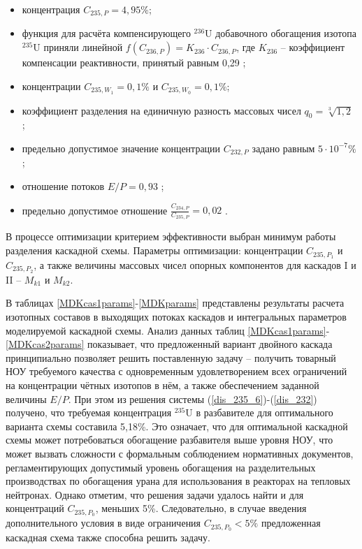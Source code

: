 {\begin{itemize}
    \item концентрация $C_{235,{P}} = {4,95\%}$; 
    \item функция для расчёта компенсирующего $^{236}$U добавочного обогащения изотопа $^{235}$U приняли линейной $f(C_{236,P}) = {K_{236}\cdot{C_{236,{P}}}}$, где $K_{236}$ -- коэффициент компенсации реактивности, принятый равным 0,29 \cite{smirnovEvolutionIsotopicComposition2012};
    \item концентрации $C_{235,{W_1}} = 0,1\%$ и $C_{235,{W_0}} = 0,1\%$;
    \item коэффициент разделения на единичную разность массовых чисел $q_{0} = \sqrt[3]{1,2}$ \cite{smirnovEvolutionIsotopicComposition2012};
    \item предельно допустимое значение концентрации $C_{232,{P}}$ задано равным $5\cdot10^{-7} \%$;
    \item отношение потоков $E/P = 0,93$ \cite{smirnovObogashchenieRegenerirovannogoUrana2018};
    \item предельно допустимое отношение $\frac{C_{234,{P}}}{C_{235,{P}}} = 0,02$ \cite{smirnovObogashchenieRegenerirovannogoUrana2018}. 
\end{itemize}

В процессе оптимизации критерием эффективности выбран минимум работы разделения каскадной схемы. Параметры оптимизации: концентрации $C_{235,{P_1}}$ и $C_{235,{P_2}}$, а также величины массовых чисел опорных компонентов для каскадов I и II -- $M_{k1}$ и $M_{k2}$. 

В таблицах \ref{MDKcas1params}-\ref{MDKparams} представлены результаты расчета изотопных составов в выходящих потоках каскадов и интегральных параметров моделируемой каскадной схемы. Анализ данных таблиц \ref{MDKcas1params}-\ref{MDKcas2params} показывает, что предложенный вариант двойного каскада принципиально позволяет решить поставленную задачу -- получить товарный НОУ требуемого качества с одновременным удовлетворением всех ограничений на концентрации чётных изотопов в нём, а также обеспечением заданной величины $E/P$. При этом из решения системы (\ref{dis_235_6})-(\ref{dis_232}) получено, что требуемая концентрация $^{235}$U в разбавителе для оптимального варианта схемы составила 5,18\%. Это означает, что для оптимальной каскадной схемы может потребоваться обогащение разбавителя выше уровня НОУ, что может вызвать сложности с формальным соблюдением нормативных документов, регламентирующих допустимый уровень обогащения на разделительных производствах по обогащения урана для использования в реакторах на тепловых нейтронах. Однако отметим, что решения задачи удалось найти и для концентраций $C_{235,{P_0}}$, меньших 5\%. Следовательно, в случае введения дополнительного условия в виде ограничения $C_{235,{P_0}} < 5\%$ предложенная каскадная схема также способна решить задачу. 

}

